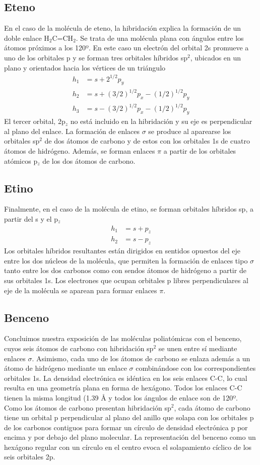 \documentclass{tufte-handout}
\begin{document}
\subsection{Eteno}
En el caso de la molécula de eteno, la hibridación explica
la formación de un doble enlace H$_2$C=CH$_2$. Se trata de 
una molécula plana con ángulos entre los átomos próximos
a los 120º. En este caso un electrón del orbital 2s promueve
a uno  de los orbitales p y se forman tres orbitales híbridos
sp$^2$, ubicados en un plano y orientados hacia los vértices
de un triángulo
\begin{align*}
    h_1&=s+2^{1/2}p_y\\
    h_2&=s+(3/2)^{1/2}p_x-(1/2)^{1/2}p_y\\
    h_3&=s-(3/2)^{1/2}p_x-(1/2)^{1/2}p_y
\end{align*}
El tercer orbital, 2p$_z$ no está incluido
en la hibridación y su eje es perpendicular al plano del
enlace.  La formación de enlaces $\sigma$ se produce al aparearse
los orbitales sp$^2$ de dos átomos de carbono y de estos
con los orbitales 1s de cuatro átomos de hidrógeno. Además,
se forman enlaces $\pi$ a partir de los orbitales atómicos
p$_z$ de los dos átomos de carbono.

\subsection{Etino}
Finalmente, en el caso de la molécula de etino, se forman
orbitales híbridos sp, a partir del s y el p$_z$
\begin{align*}
    h_1&=s+p_z\\
    h_2&=s-p_z
\end{align*}
Los orbitales híbridos resultantes están dirigidos en sentidos
opuestos del eje entre los dos núcleos de la molécula, que
permiten la formación de enlaces tipo $\sigma$ tanto entre
los dos carbonos como con sendos átomos de hidrógeno
a partir de sus orbitales 1s. Los electrones que ocupan orbitales
p libres perpendiculares al eje de la molécula se aparean
para formar enlaces $\pi$.

\subsection{Benceno}
Concluimos nuestra exposición de las moléculas poliatómicas
con el benceno, cuyos seis átomos de carbono con hibridación 
sp$^2$ se unen entre sí mediante enlaces $\sigma$. Asimismo,
cada uno de los átomos de carbono se enlaza además a un átomo 
de hidrógeno mediante un enlace $\sigma$ combinándose con los
correspondientes orbitales 1s. La densidad electrónica es 
idéntica en los seis enlaces C-C, lo cual resulta en una geometría
plana en forma de hexágono. Todos los enlaces C-C tienen la 
misma longitud (1.39 {\AA} y todos los ángulos de enlace 
son de 120º. Como los átomos de carbono presentan hibridación
sp$^2$, cada átomo de carbono tiene un orbital p perpendicular
al plano del anillo que solapa con los orbitales p de los 
carbonos contiguos para formar un círculo de densidad electrónica 
p por encima y por debajo del plano molecular.
La representación del benceno como un hexágono regular con un 
círculo en el centro evoca el solapamiento cíclico de los seis
orbitales 2p.
\end{document}
